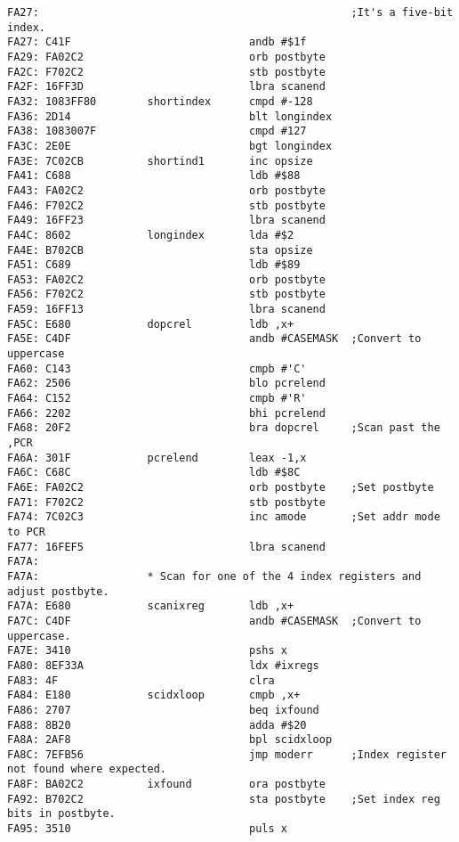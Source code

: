 {\begin{verbatim}
FA27:                                                 ;It's a five-bit index.
FA27: C41F                            andb #$1f
FA29: FA02C2                          orb postbyte
FA2C: F702C2                          stb postbyte
FA2F: 16FF3D                          lbra scanend
FA32: 1083FF80        shortindex      cmpd #-128
FA36: 2D14                            blt longindex
FA38: 1083007F                        cmpd #127
FA3C: 2E0E                            bgt longindex
FA3E: 7C02CB          shortind1       inc opsize
FA41: C688                            ldb #$88
FA43: FA02C2                          orb postbyte
FA46: F702C2                          stb postbyte
FA49: 16FF23                          lbra scanend
FA4C: 8602            longindex       lda #$2
FA4E: B702CB                          sta opsize
FA51: C689                            ldb #$89
FA53: FA02C2                          orb postbyte
FA56: F702C2                          stb postbyte
FA59: 16FF13                          lbra scanend
FA5C: E680            dopcrel         ldb ,x+
FA5E: C4DF                            andb #CASEMASK  ;Convert to uppercase
FA60: C143                            cmpb #'C'
FA62: 2506                            blo pcrelend
FA64: C152                            cmpb #'R'
FA66: 2202                            bhi pcrelend
FA68: 20F2                            bra dopcrel     ;Scan past the ,PCR 
FA6A: 301F            pcrelend        leax -1,x
FA6C: C68C                            ldb #$8C
FA6E: FA02C2                          orb postbyte    ;Set postbyte
FA71: F702C2                          stb postbyte    
FA74: 7C02C3                          inc amode       ;Set addr mode to PCR
FA77: 16FEF5                          lbra scanend
FA7A:                 
FA7A:                 * Scan for one of the 4 index registers and adjust postbyte. 
FA7A: E680            scanixreg       ldb ,x+
FA7C: C4DF                            andb #CASEMASK  ;Convert to uppercase.
FA7E: 3410                            pshs x
FA80: 8EF33A                          ldx #ixregs
FA83: 4F                              clra
FA84: E180            scidxloop       cmpb ,x+
FA86: 2707                            beq ixfound
FA88: 8B20                            adda #$20
FA8A: 2AF8                            bpl scidxloop
FA8C: 7EFB56                          jmp moderr      ;Index register not found where expected.
FA8F: BA02C2          ixfound         ora postbyte
FA92: B702C2                          sta postbyte    ;Set index reg bits in postbyte.
FA95: 3510                            puls x

\end{verbatim}}
